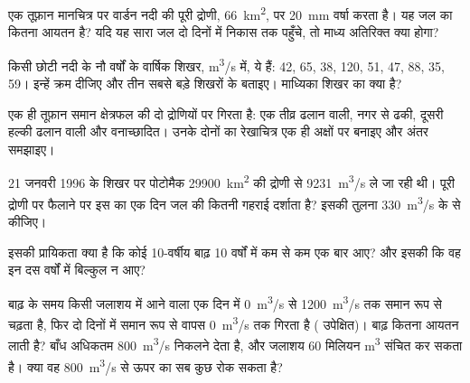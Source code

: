 \begin{exercise}[$\star\star$]\label{exo:g10:drainage-basins:7}
एक तूफ़ान मानचित्र पर वार्डन नदी की पूरी द्रोणी, \qty{66}{km^2}, पर \qty{20}{mm} वर्षा
करता है। यह जल का कितना आयतन है? यदि यह सारा जल
दो दिनों में निकास तक पहुँचे, तो माध्य अतिरिक्त  क्या होगा?
\end{exercise}

\begin{exercise}[$\star\star$]\label{exo:g10:drainage-basins:8}
किसी छोटी नदी के नौ वर्षों के वार्षिक शिखर, \unit{m^3/s} में, ये हैं:
\num{42}, \num{65}, \num{38}, \num{120}, \num{51}, \num{47}, \num{88},
\num{35}, \num{59}। इन्हें क्रम दीजिए और तीन सबसे बड़े शिखरों के  बताइए।
माध्यिका शिखर का  क्या है?
\end{exercise}

\begin{exercise}[$\star\star$]\label{exo:g10:drainage-basins:9}
एक ही तूफ़ान समान क्षेत्रफल की दो द्रोणियों पर गिरता है: एक तीव्र ढलान वाली, नगर से ढकी,
दूसरी हल्की ढलान वाली और वनाच्छादित। उनके दोनों  का रेखाचित्र
एक ही अक्षों पर बनाइए और अंतर समझाइए।
\end{exercise}

\begin{exercise}[$\star\star$]\label{exo:g10:drainage-basins:10}
21 जनवरी 1996 के शिखर पर पोटोमैक \qty{29900}{km^2} की
द्रोणी से \qty{9231}{m^3/s} ले जा रही थी। पूरी द्रोणी पर फैलाने पर इस  का
एक दिन जल की कितनी गहराई दर्शाता है? इसकी तुलना
\qty{330}{m^3/s} के  से कीजिए।
\end{exercise}

\begin{exercise}[$\star\star$]\label{exo:g10:drainage-basins:11}
इसकी प्रायिकता क्या है कि कोई \num{10}-वर्षीय बाढ़ \num{10} वर्षों में कम से कम एक बार
आए? और इसकी कि वह इन दस वर्षों में बिल्कुल न आए?
\end{exercise}

\begin{exercise}[$\star\star\star$]\label{exo:g10:drainage-basins:12}
बाढ़ के समय किसी जलाशय में आने वाला  एक दिन में \qty{0}{m^3/s} से
\qty{1200}{m^3/s} तक समान रूप से चढ़ता है, फिर दो दिनों में समान रूप से वापस
\qty{0}{m^3/s} तक गिरता है ( उपेक्षित)। बाढ़ कितना आयतन
लाती है? बाँध अधिकतम \qty{800}{m^3/s} निकलने देता है, और जलाशय
\num{60} मिलियन \unit{m^3} संचित कर सकता है। क्या वह
\qty{800}{m^3/s} से ऊपर का सब कुछ रोक सकता है?
\end{exercise}

